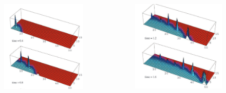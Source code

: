 \documentclass{beamer}
\begin{document}
\begin{frame}
    \begin{columns}
        \begin{column}{0.5\textwidth}
            \begin{figure}
                \includegraphics[width=\textwidth]{gog_2d_a.png}
            \end{figure}        
        \end{column}
        \begin{column}{0.5\textwidth}
            \begin{figure}
                \includegraphics[width=\textwidth]{gog_2d_b.png}

\end{figure}
\end{column}
\end{columns}
\end{frame}
\end{document}
